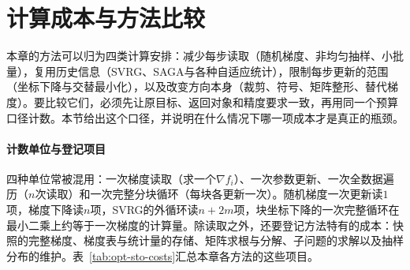 \section{计算成本与方法比较}
\label{sec:opt-sto-cost}

本章的方法可以归为四类计算安排：减少每步读取（随机梯度、非均匀抽样、小批量），复用历史信息（SVRG、SAGA与各种自适应统计），限制每步更新的范围（坐标下降与交替最小化），以及改变方向本身（裁剪、符号、矩阵整形、替代梯度）。要比较它们，必须先让原目标、返回对象和精度要求一致，再用同一个预算口径计数。本节给出这个口径，并说明在什么情况下哪一项成本才是真正的瓶颈。

\paragraph{计数单位与登记项目}
四种单位常被混用：一次梯度读取（求一个$\nabla f_i$）、一次参数更新、一次全数据遍历（$n$次读取）和一次完整分块循环（每块各更新一次）。随机梯度一次更新读$1$项，梯度下降读$n$项，SVRG的外循环读$n+2m$项，块坐标下降的一次完整循环在最小二乘上约等于一次梯度的计算量。除读取之外，还要登记方法特有的成本：快照的完整梯度、梯度表与统计量的存储、矩阵求根与分解、子问题的求解以及抽样分布的维护。表~\ref{tab:opt-sto-costs}汇总本章各方法的这些项目。

